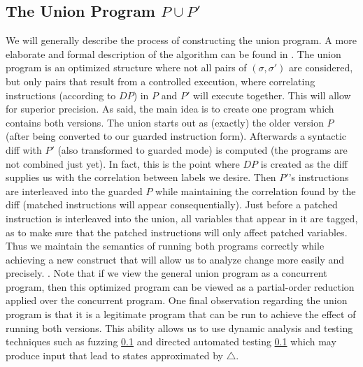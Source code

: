 \subsection{The Union Program $P \cup P'$ }
We will generally describe the process of constructing the union program. A more elaborate and formal description of the algorithm can be found in . The union program is an optimized structure where not all pairs of $(\sigma,\sigma')$ are considered, but only pairs that result from a controlled execution, where correlating instructions (according to $DP$) in $P$ and $P'$ will execute together. This will allow for superior precision. As said, the main idea is to create one program which contains both versions. The union starts out as (exactly) the older version $P$ (after being converted to our guarded instruction form). Afterwards a syntactic diff with $P'$ (also transformed to guarded mode) is computed (the programs are not combined just yet). In fact, this is the point where $DP$ is created as the diff supplies us with the correlation between labels we desire. Then $P'$'s instructions are interleaved into the guarded $P$ while maintaining the correlation found by the diff (matched instructions will appear consequentially). Just before a patched instruction is interleaved into the union, all variables that appear in it are tagged, as to make sure that the patched instructions will only affect patched variables. Thus we maintain the semantics of running both programs correctly while achieving a new construct that will allow us to analyze change more easily and precisely. . Note that if we view the general union program as a concurrent program, then this optimized program can be viewed as a partial-order reduction applied over the concurrent program. One final observation regarding the union program is that it is a legitimate program that can be run to achieve the effect of running both versions. This ability allows us to use dynamic analysis and testing techniques such as fuzzing \ref{} and directed automated testing \ref{} which may produce input that lead to states approximated by $\triangle$.

